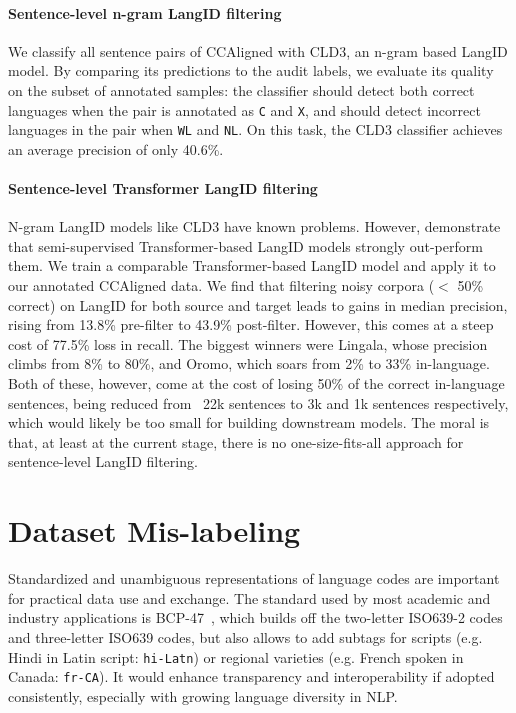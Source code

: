 \paragraph{Sentence-level n-gram LangID filtering}
We classify all sentence pairs of CCAligned with CLD3, an n-gram based LangID model. By comparing its predictions to the audit labels, we evaluate its quality on the subset of annotated samples: the classifier should detect both correct languages when the pair is annotated as \texttt{C} and \texttt{X}, and should detect incorrect languages in the pair when \texttt{WL} and \texttt{NL}. On this task, the CLD3 classifier
achieves an average precision of only 40.6\%. %

\paragraph{Sentence-level Transformer LangID filtering}
N-gram LangID models like CLD3 have known problems. However, \citet{caswell-etal-2020-language} demonstrate that semi-supervised Transformer-based LangID models strongly out-perform them. We train a comparable Transformer-based LangID model and apply it to our annotated CCAligned data. We find that filtering noisy corpora ($<$ 50\% correct) on LangID for both source and target leads to gains in median precision, rising from 13.8\% pre-filter to 43.9\% post-filter. However, this comes at a steep cost of 77.5\% loss in recall.
The biggest winners were Lingala, whose precision climbs from 8\% to 80\%, and Oromo, which soars from 2\% to 33\% in-language. Both of these, however, come at the cost of losing 50\% of the correct in-language sentences, being reduced from ~22k sentences to 3k and 1k sentences respectively, which would likely be too small for building downstream models. The moral is that, at least at the current stage, there is no one-size-fits-all approach for sentence-level LangID filtering.


\section{Dataset Mis-labeling}
\label{sec:codes}
Standardized and unambiguous representations of language codes are important for practical data use and exchange. The standard used by most academic and industry applications is BCP-47~\citep{phillips-etal-2005-tags}, which builds off the two-letter ISO639-2 codes and three-letter ISO639 codes, but also allows to add subtags for scripts (e.g. Hindi in Latin script: \texttt{hi-Latn}) or regional varieties (e.g. French spoken in Canada: \texttt{fr-CA}). It would enhance transparency and interoperability if adopted consistently, especially with growing language diversity in NLP.


